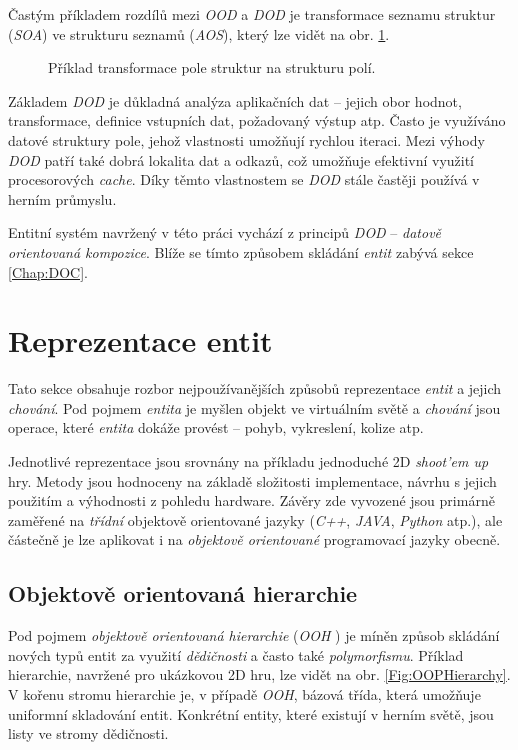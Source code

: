 Častým příkladem rozdílů mezi \emph{OOD} a \emph{DOD} je transformace seznamu struktur (\emph{SOA}) ve strukturu seznamů (\emph{AOS}), který lze vidět na obr. \ref{Fig:SOAASO}.

\begin{figure}[]
	\caption{Příklad transformace pole struktur na strukturu polí.}
	\label{Fig:SOAASO}
\end{figure}

Základem \emph{DOD} je důkladná analýza aplikačních dat -- jejich obor hodnot, transformace, definice vstupních dat, požadovaný výstup atp. Často je využíváno datové struktury pole, jehož vlastnosti umožňují rychlou iteraci. Mezi výhody \emph{DOD} patří také dobrá lokalita dat a odkazů, což umožňuje efektivní využití procesorových \emph{cache}. Díky těmto vlastnostem se \emph{DOD} stále častěji používá v herním průmyslu\cite{DataOrientedDesignDice}\cite{DataOrientedDesignCppCon}.

Entitní systém navržený v této práci vychází z principů \emph{DOD} -- \emph{datově orientovaná kompozice}\cite{DODComponents}. Blíže se tímto způsobem skládání \emph{entit} zabývá sekce \ref{Chap:DOC}.

\section{Reprezentace entit}
\label{Chap:Representation}

Tato sekce obsahuje rozbor nejpoužívanějších způsobů reprezentace \emph{entit}\cite{EvolveHierarchy} a jejich \emph{chování}. Pod pojmem \emph{entita} je myšlen objekt ve virtuálním světě a \emph{chování} jsou operace, které \emph{entita} dokáže provést -- pohyb, vykreslení, kolize atp.

Jednotlivé reprezentace jsou srovnány na příkladu jednoduché 2D \emph{shoot'em up} hry. Metody jsou hodnoceny na základě složitosti implementace, návrhu s jejich použitím a výhodnosti z pohledu hardware. Závěry zde vyvozené jsou primárně zaměřené na \emph{třídní} objektově orientované jazyky (\emph{C++}, \emph{JAVA}, \emph{Python} atp.), ale částečně je lze aplikovat i na \emph{objektově orientované} programovací jazyky obecně.

\subsection{Objektově orientovaná hierarchie}

Pod pojmem \emph{objektově orientovaná hierarchie} (\emph{OOH} \cite{GameDesignPatterns}) je míněn způsob skládání nových typů entit za využití \emph{dědičnosti} a často také \emph{polymorfismu}. Příklad hierarchie, navržené pro ukázkovou 2D hru, lze vidět na obr. \ref{Fig:OOPHierarchy}. V kořenu stromu hierarchie je, v případě \emph{OOH}, bázová třída, která umožňuje uniformní skladování entit. Konkrétní entity, které existují v herním světě, jsou listy ve stromy dědičnosti.

